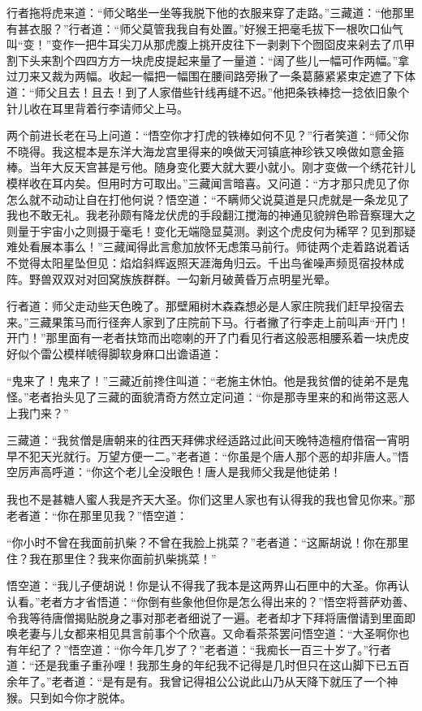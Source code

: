 \documentclass[12pt,UTF8]{ctexbook}
\begin{document}
{行者拖将虎来道：“师父略坐一坐等我脱下他的衣服来穿了走路。”三藏道：“他那里有甚衣服？”行者道：“师父莫管我我自有处置。”好猴王把毫毛拔下一根吹口仙气叫“变！”变作一把牛耳尖刀从那虎腹上挑开皮往下一剥剥下个囫囵皮来剁去了爪甲割下头来割个四四方方一块虎皮提起来量了一量道：“阔了些儿一幅可作两幅。”拿过刀来又裁为两幅。收起一幅把一幅围在腰间路旁揪了一条葛藤紧紧束定遮了下体道：“师父且去！且去！到了人家借些针线再缝不迟。”他把条铁棒捻一捻依旧象个针儿收在耳里背着行李请师父上马。

两个前进长老在马上问道：“悟空你才打虎的铁棒如何不见？”行者笑道：“师父你不晓得。我这棍本是东洋大海龙宫里得来的唤做天河镇底神珍铁又唤做如意金箍棒。当年大反天宫甚是亏他。随身变化要大就大要小就小。刚才变做一个绣花针儿模样收在耳内矣。但用时方可取出。”三藏闻言暗喜。又问道：“方才那只虎见了你怎么就不动动让自在打他何说？悟空道：“不瞒师父说莫道是只虎就是一条龙见了我也不敢无礼。我老孙颇有降龙伏虎的手段翻江搅海的神通见貌辨色聆音察理大之则量于宇宙小之则摄于毫毛！变化无端隐显莫测。剥这个虎皮何为稀罕？见到那疑难处看展本事么！”三藏闻得此言愈加放怀无虑策马前行。师徒两个走着路说着话不觉得太阳星坠但见：焰焰斜辉返照天涯海角归云。千出鸟雀噪声频觅宿投林成阵。野兽双双对对回窝族族群群。一勾新月破黄昏万点明星光晕。

行者道：师父走动些天色晚了。那壁厢树木森森想必是人家庄院我们赶早投宿去来。”三藏果策马而行径奔人家到了庄院前下马。行者撇了行李走上前叫声“开门！开门！”那里面有一老者扶筇而出唿喇的开了门看见行者这般恶相腰系着一块虎皮好似个雷公模样唬得脚软身麻口出谵语道：

“鬼来了！鬼来了！”三藏近前搀住叫道：“老施主休怕。他是我贫僧的徒弟不是鬼怪。”老者抬头见了三藏的面貌清奇方然立定问道：“你是那寺里来的和尚带这恶人上我门来？”

三藏道：“我贫僧是唐朝来的往西天拜佛求经适路过此间天晚特造檀府借宿一宵明早不犯天光就行。万望方便一二。”老者道：“你虽是个唐人那个恶的却非唐人。”悟空厉声高呼道：“你这个老儿全没眼色！唐人是我师父我是他徒弟！

我也不是甚糖人蜜人我是齐天大圣。你们这里人家也有认得我的我也曾见你来。”那老者道：“你在那里见我？”悟空道：

“你小时不曾在我面前扒柴？不曾在我脸上挑菜？”老者道：“这厮胡说！你在那里住？我在那里住？我来你面前扒柴挑菜！”

悟空道：“我儿子便胡说！你是认不得我了我本是这两界山石匣中的大圣。你再认认看。”老者方才省悟道：“你倒有些象他但你是怎么得出来的？”悟空将菩萨劝善、令我等待唐僧揭贴脱身之事对那老者细说了一遍。老者却才下拜将唐僧请到里面即唤老妻与儿女都来相见具言前事个个欣喜。又命看茶茶罢问悟空道：“大圣啊你也有年纪了？”悟空道：“你今年几岁了？”老者道：“我痴长一百三十岁了。”行者道：“还是我重子重孙哩！我那生身的年纪我不记得是几时但只在这山脚下已五百余年了。”老者道：“是有是有。我曾记得祖公公说此山乃从天降下就压了一个神猴。只到如今你才脱体。

}
\end{document}
